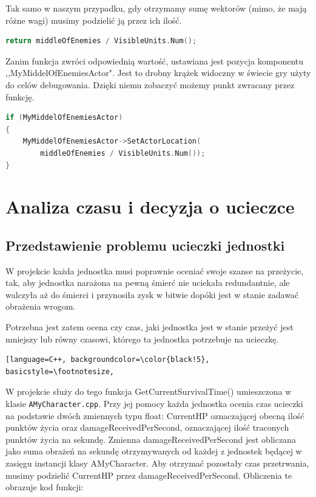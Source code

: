 \documentclass[12pt]{report}
\begin{document}
Tak samo w naszym przypadku, gdy otrzymamy sumę wektorów (mimo, że mają różne wagi) musimy podzielić ją przez ich ilość.
\begin{lstlisting}[language=C++, backgroundcolor=\color{black!5}, basicstyle=\footnotesize, caption=Wartość zwracana funkcji GetMiddleOfEnemies();]
return middleOfEnemies / VisibleUnits.Num();
\end{lstlisting}

Zanim funkcja zwróci odpowiednią wartość, ustawiana jest pozycja komponentu ,,MyMiddelOfEnemiesActor". Jest to drobny krążek widoczny w świecie gry użyty do celów debugowania. Dzięki niemu zobaczyć możemy punkt zwracany przez funkcję.

\begin{lstlisting}[language=C++, backgroundcolor=\color{black!5}, basicstyle=\footnotesize, caption=Ustawienie pozycji komponentu MyMiddelOfEnemiesActor w funkcji GetMiddleOfEnemies();]
if (MyMiddelOfEnemiesActor)
{
	MyMiddelOfEnemiesActor->SetActorLocation(
	    middleOfEnemies / VisibleUnits.Num());
}
\end{lstlisting}

\section{Analiza czasu i decyzja o ucieczce}
\subsection{Przedstawienie problemu ucieczki jednostki}
W projekcie każda jednostka musi poprawnie oceniać swoje szanse na przeżycie, tak, aby jednostka narażona na pewną śmierć nie uciekała redundantnie, ale walczyła aż do śmierci i przynosiła zysk w bitwie dopóki jest w stanie zadawać obrażenia wrogom.

Potrzebna jest zatem ocena czy czas, jaki jednostka jest w stanie przeżyć jest mniejszy lub równy czasowi, którego ta jednostka potrzebuje na ucieczkę.

\begin{lstlisting}[language=C++, backgroundcolor=\color{black!5}, basicstyle=\footnotesize, 

\end{lstlisting}


W projekcie służy do tego funkcja GetCurrentSurvivalTime() umieszczona w klasie \texttt{AMyCharacter.cpp}. Przy jej pomocy każda jednostka ocenia czas ucieczki na podstawie dwóch zmiennych typu float: CurrentHP oznaczającej obecną ilość punktów życia oraz damageReceivedPerSecond, oznaczającej ilość traconych punktów życia na sekundę. Zmienna damageReceivedPerSecond jest obliczana jako suma obrażeń na sekundę otrzymywanych od każdej z jednostek będącej w zasięgu instancji klasy AMyCharacter. Aby otrzymać pozostały czas przetrwania, musimy podzielić CurrentHP przez damageReceivedPerSecond. Obliczenia te obrazuje kod funkcji:
\end{document}
